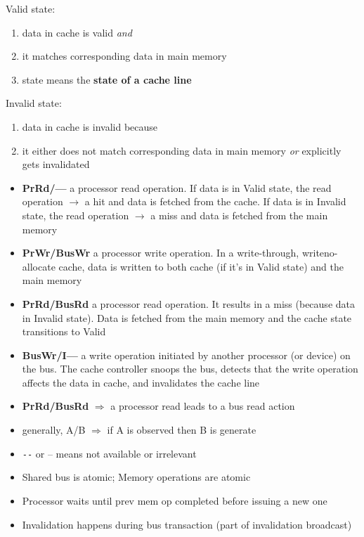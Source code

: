 \begin{minipage}[t]{0.5\linewidth}
  \flushleft
  \textsf{Valid} state:
  \begin{enumerate}
  \item data in cache is valid \emph{and}
  \item it matches corresponding data in main memory
  \item[] state means the \textbf{state of a cache line}
  \end{enumerate}
\end{minipage}
\begin{minipage}[t]{0.5\linewidth}
  \flushleft
  \textsf{Invalid} state:
    \begin{enumerate}
    \item data in cache is invalid because
    \item it either does not match corresponding data in main memory \emph{or} explicitly gets invalidated
    \end{enumerate}
\end{minipage}
\begin{itemize}
\item \textbf{PrRd/—} a processor read operation. If data is in \textsf{Valid} state,
the read operation $\rightarrow$ a hit and data is fetched from the cache.  If data is in \textsf{Invalid} state, the read operation $\rightarrow$ a miss and data is fetched from the main memory
\item \textbf{PrWr/BusWr} a processor write operation. In a write-through, writeno-allocate cache, data is written to both cache (if it’s in \textsf{Valid} state) and the main memory
\item \textbf{PrRd/BusRd} a processor read operation. It results in a miss
(because data in \textsf{Invalid} state).  Data is fetched from the main memory
and the cache state transitions to \textsf{Valid}
\item \textbf{BusWr/I—} a write operation initiated by another processor (or
device) on the bus.  The cache controller snoops the bus, detects that the write
operation affects the data in cache, and invalidates the cache line
\item \textbf{PrRd/BusRd} $\Rightarrow$ a processor read leads to a bus read action
\item generally, A/B $\Rightarrow$ if A is observed then B is generate
\item \verb|--| or -- means not available or irrelevant
\item Shared bus is atomic; Memory operations are atomic
\item Processor waits until prev mem op completed before issuing a new one
\item Invalidation happens during bus transaction (part of invalidation broadcast)
\end{itemize}
